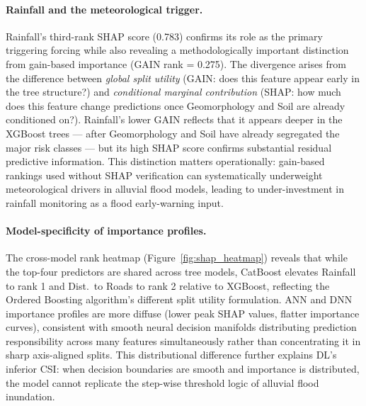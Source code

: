 \documentclass[12pt, a4paper]{article}
\begin{document}
\paragraph{Rainfall and the meteorological trigger.}
Rainfall's third-rank SHAP score (0.783) confirms its role as the primary triggering forcing while also revealing a methodologically important distinction from gain-based importance (GAIN rank = 0.275).  The divergence arises from the difference between \textit{global split utility} (GAIN: does this feature appear early in the tree structure?) and \textit{conditional marginal contribution} (SHAP: how much does this feature change predictions once Geomorphology and Soil are already conditioned on?).  Rainfall's lower GAIN reflects that it appears deeper in the XGBoost trees --- after Geomorphology and Soil have already segregated the major risk classes --- but its high SHAP score confirms substantial residual predictive information.  This distinction matters operationally: gain-based rankings used without SHAP verification can systematically underweight meteorological drivers in alluvial flood models, leading to under-investment in rainfall monitoring as a flood early-warning input.

\paragraph{Model-specificity of importance profiles.}
The cross-model rank heatmap (Figure~\ref{fig:shap_heatmap}) reveals that while the top-four predictors are shared across tree models, CatBoost elevates Rainfall to rank 1 and Dist.\ to Roads to rank 2 relative to XGBoost, reflecting the Ordered Boosting algorithm's different split utility formulation.  ANN and DNN importance profiles are more diffuse (lower peak SHAP values, flatter importance curves), consistent with smooth neural decision manifolds distributing prediction responsibility across many features simultaneously rather than concentrating it in sharp axis-aligned splits.  This distributional difference further explains DL's inferior CSI: when decision boundaries are smooth and importance is distributed, the model cannot replicate the step-wise threshold logic of alluvial flood inundation.
\end{document}
